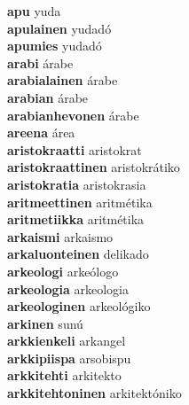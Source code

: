 \textbf{apu } yuda \\
\textbf{apulainen } yudadó \\
\textbf{apumies } yudadó \\
\textbf{arabi } árabe \\
\textbf{arabialainen } árabe \\
\textbf{arabian } árabe \\
\textbf{arabianhevonen } árabe \\
\textbf{areena } área \\
\textbf{aristokraatti } aristokrat \\
\textbf{aristokraattinen } aristokrátiko \\
\textbf{aristokratia } aristokrasia \\
\textbf{aritmeettinen } aritmétika \\
\textbf{aritmetiikka } aritmétika \\
\textbf{arkaismi } arkaismo \\
\textbf{arkaluonteinen } delikado \\
\textbf{arkeologi } arkeólogo \\
\textbf{arkeologia } arkeologia \\
\textbf{arkeologinen } arkeológiko \\
\textbf{arkinen } sunú \\
\textbf{arkkienkeli } arkangel \\
\textbf{arkkipiispa } arsobispu \\
\textbf{arkkitehti } arkitekto \\
\textbf{arkkitehtoninen } arkitektóniko \\
